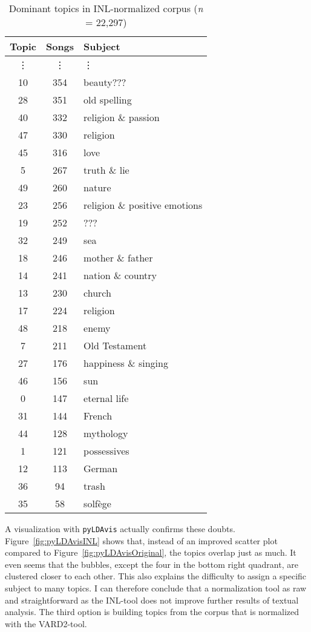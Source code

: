 \begin{table}
\begin{minipage}{0.5\textwidth}
		\begin{tabular}{|ccl}
			\toprule
			Topic & Songs & Subject  \\
			\midrule
			\vdots & \vdots & \vdots \\
			10             &   354 & beauty??? \\
			28             &   351 & old spelling \\
			40             &   332 & religion \& passion \\
			47             &   330 & religion \\
			45             &   316 & love  \\
			5              &   267 &  truth \& lie \\
			49             &   260 & nature \\
			23             &   256 & religion \& positive emotions \\
			19             &   252 & ??? \\
			32             &   249 & sea \\
			18             &   246 & mother \& father \\
			14             &   241 & nation \& country \\
			13             &   230 & church \\
			17             &   224 & religion \\
			48             &   218 & enemy \\
			7              &   211 & Old Testament \\
			27             &   176 & happiness \& singing \\
			46             &   156 & sun \\
			0              &   147 & eternal life \\
			31             &   144 & French \\
			44             &   128 & mythology \\
			1              &   121 & possessives \\
			12             &   113 & German \\
			36             &    94 & trash \\
			35             &    58 & solfège \\
			\bottomrule
		\end{tabular}
	\end{minipage}
\caption{Dominant topics in INL-normalized corpus (\textit{n} = 22,297)}
\label{table:DomTopINL}
\end{table}

A visualization with \texttt{pyLDAvis} actually confirms these doubts. Figure~\ref{fig:pyLDAvisINL} shows that, instead of an improved scatter plot compared to Figure~\ref{fig:pyLDAvisOriginal}, the topics overlap just as much. It even seems that the bubbles, except the four in the bottom right quadrant, are clustered closer to each other. This also explains the difficulty to assign a specific subject to many topics. I can therefore conclude that a normalization tool as raw and straightforward as the INL-tool does not improve further results of textual analysis. The third option is building topics from the corpus that is normalized with the VARD2-tool.

